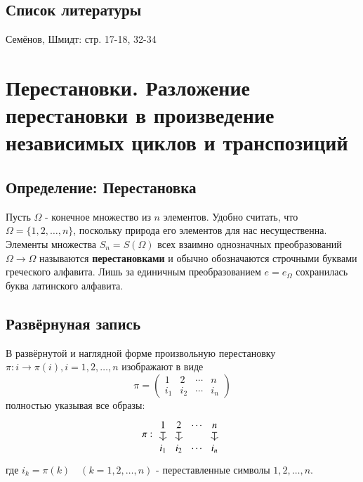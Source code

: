 \documentclass{article}
\begin{document}
\subsection*{Список литературы}
Семёнов, Шмидт: стр. 17-18, 32-34


\newpage
\section{Перестановки. Разложение перестановки в произведение независимых циклов и транспозиций}
\subsection{Определение: Перестановка}
Пусть $\Omega$ - конечное множество из $n$ элементов. Удобно считать, что $\Omega = \{1, 2, \dots, n\}$, поскольку природа его элементов для нас несущественна. Элементы множества $S_n = S(\Omega)$ всех взаимно однозначных преобразований $\Omega \rightarrow \Omega$ называются \textbf{перестановками} и обычно обозначаются строчными буквами греческого алфавита. Лишь за единичным преобразованием $e = e_\Omega$ сохранилась буква латинского алфавита.

\subsection{Развёрнуная запись}
В развёрнутой и наглядной форме произвольную перестановку $\pi : i \rightarrow \pi(i), i = 1, 2, \dots, n$ изображают в виде \[
\pi = \left(\begin{matrix}1 & 2 & \cdots & n \\ i_1 & i_2 & \cdots & i_n \end{matrix} \right)
\] полностью указывая все образы: \[
\pi: 
\begin{tikzcd}[column sep=0.5, row sep=small]
1 \dar[mapsto]	& 2 \dar[mapsto]	& \cdots	& n \dar[mapsto] \\
i_1 			& i_2 				& \cdots 	& i_n
\end{tikzcd}
\] где $i_k = \pi(k) \quad (k = 1, 2, \dots, n)$ - переставленные символы $1, 2, \dots, n$.
\end{document}
